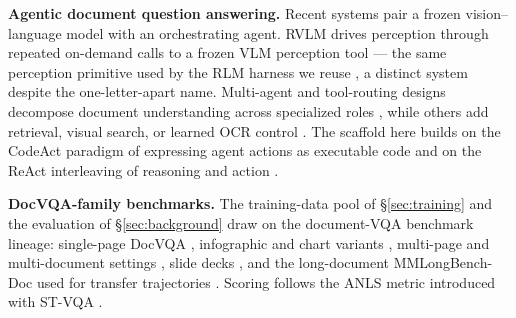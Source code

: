 \textbf{Agentic document question answering.} Recent systems pair a frozen vision--language model with an orchestrating agent. RVLM \citep{rvlm} drives perception through repeated on-demand calls to a frozen VLM perception tool --- the same perception primitive used by the RLM harness we reuse \citep{rlm}, a distinct system despite the one-letter-apart name. Multi-agent and tool-routing designs decompose document understanding across specialized roles \citep{madqa,mdocagent,orca,slideagent}, while others add retrieval, visual search, or learned OCR control \citep{arial,visor,docvstar,agenticocr}. The scaffold here builds on the CodeAct paradigm of expressing agent actions as executable code \citep{codeact} and on the ReAct interleaving of reasoning and action \citep{react}.

\textbf{DocVQA-family benchmarks.} The training-data pool of \S\ref{sec:training} and the evaluation of \S\ref{sec:background} draw on the document-VQA benchmark lineage: single-page DocVQA \citep{docvqa}, infographic and chart variants \citep{infographicvqa,chartqa}, multi-page and multi-document settings \citep{mpdocvqa,dude}, slide decks \citep{slidevqa}, and the long-document MMLongBench-Doc used for transfer trajectories \citep{mmlongbench}. Scoring follows the ANLS metric introduced with ST-VQA \citep{stvqa}.
